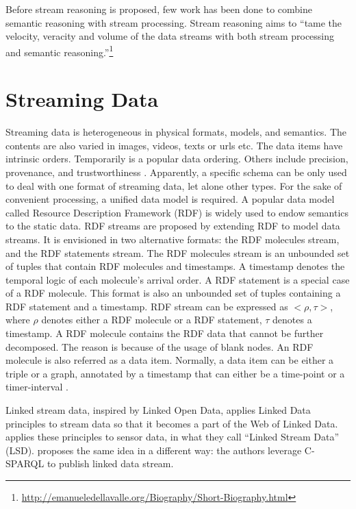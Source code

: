 Before stream reasoning \cite{della2009s} is proposed, few work has been done to combine semantic reasoning with stream processing. 
Stream reasoning aims to ``tame the velocity, veracity and volume of the data streams with both stream processing and semantic reasoning.''\footnote{\url{http://emanueledellavalle.org/Biography/Short-Biography.html}}
%
\section{Streaming Data}
Streaming data is heterogeneous in physical formats, models, and semantics.
The contents are also varied in images, videos, texts or urls etc.
The data items have intrinsic orders.
Temporarily is a popular data ordering. 
Others include precision, provenance, and trustworthiness \cite{della2013order}.
Apparently, a specific schema can be only used to deal with one format of streaming data, let alone other types. 
For the sake of convenient processing, a unified data model is required.
A popular data model called Resource Description Framework (RDF) is widely used to endow semantics to the static data.
RDF streams \cite{della2009first} are proposed by extending RDF to model data streams. 
It is envisioned in two alternative formats: the RDF molecules stream, and the RDF statements stream.
The RDF molecules stream is an unbounded set of tuples that contain RDF molecules \cite{ding2005tracking} and timestamps.
A timestamp denotes the temporal logic of each molecule's arrival order.
A RDF statement is a special case of a RDF molecule.
This format is also an unbounded set of tuples containing a RDF statement and a timestamp. 
RDF stream can be expressed as $<\rho , \tau>$, where $\rho$ denotes either a RDF molecule or a RDF statement, $\tau$ denotes a timestamp.
A RDF molecule contains the RDF data that cannot be further decomposed. 
The reason is because of the usage of blank nodes.
An RDF molecule is also referred as a data item. 
Normally, a data item can be either a triple or a graph, annotated by a timestamp that can either be a time-point or a timer-interval \cite{srtutorial}. 

Linked stream data, inspired by Linked Open Data, applies Linked Data principles \cite{bizer2008linked} to stream data so that it becomes a part of the Web of Linked Data.
\cite{sequeda2009linked} applies these principles to sensor data, in what they call ``Linked Stream Data'' (LSD). 
\cite{barbieri2010proposal} proposes the same idea in a different way: 
the authors leverage C-SPARQL \cite{barbieri2009c} to publish linked data stream.

